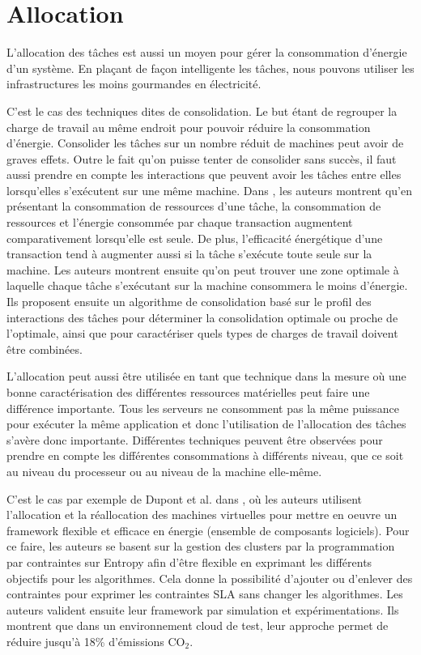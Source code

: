 \section{Allocation}
\begin{onehalfspace}
L'allocation des tâches est aussi un moyen pour gérer la consommation d'énergie d'un système.
En plaçant de façon intelligente les tâches, nous pouvons utiliser les infrastructures les
moins gourmandes en électricité.\medskip

C’est le cas des techniques dites de consolidation. Le but étant de regrouper la charge de travail au même endroit pour pouvoir réduire la consommation d’énergie. Consolider les tâches sur un nombre réduit de machines peut avoir de graves effets. Outre le fait qu’on puisse tenter de consolider sans succès, il faut aussi prendre en compte les interactions que peuvent avoir les tâches entre elles lorsqu’elles s’exécutent sur une même machine. Dans \cite{ref21}, les auteurs montrent qu’en présentant la consommation de ressources d’une tâche, la consommation de ressources et l’énergie consommée par chaque transaction augmentent comparativement lorsqu’elle est seule. De plus, l’efficacité énergétique d’une transaction tend à augmenter aussi si la tâche s’exécute toute seule sur la machine. Les auteurs montrent ensuite qu’on peut trouver une zone optimale à laquelle chaque tâche s’exécutant sur la machine consommera le moins d’énergie. Ils proposent ensuite un algorithme de consolidation basé sur le profil des interactions des tâches pour déterminer la consolidation optimale ou proche de l’optimale, ainsi que pour caractériser quels types de charges de travail doivent être combinées.\medskip

L’allocation peut aussi être utilisée en tant que technique dans la mesure où une bonne caractérisation des différentes ressources matérielles peut faire une différence importante. Tous les serveurs ne consomment pas la même puissance pour exécuter la même application et donc l’utilisation de l’allocation des tâches s’avère donc importante. Différentes techniques peuvent être observées pour prendre en compte les différentes consommations à différents niveau, que ce soit au niveau du processeur ou au niveau de la machine elle-même.\medskip

C’est le cas par exemple de Dupont et al. dans \cite{ref22}, où les auteurs utilisent l’allocation et la réallocation des machines virtuelles pour mettre en oeuvre un framework flexible et efficace en énergie (ensemble de composants logiciels). Pour ce faire, les auteurs se basent sur  la gestion des clusters par la  programmation par contraintes sur Entropy \cite{ref23} afin d’être flexible en exprimant les différents objectifs pour les algorithmes. Cela donne la possibilité d’ajouter ou d’enlever des contraintes pour exprimer les contraintes SLA sans changer les algorithmes. Les auteurs valident ensuite leur framework par simulation et expérimentations. Ils montrent que dans un environnement cloud de test, leur approche permet de réduire jusqu’à 18\% d’émissions CO$_{2}$.

\end{onehalfspace}

